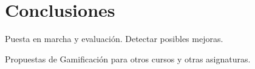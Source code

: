 \documentclass[a4paper, 12pt]{book}
\begin{document}

\cleardoublepage
\chapter{Conclusiones}
\label{chap:conclusiones}



\label{sec:trabajos_futuros}

Puesta en marcha y evaluación. Detectar posibles mejoras.

Propuestas de Gamificación para otros cursos y otras asignaturas.




\cleardoublepage
\appendix



\cleardoublepage



\printindex
\end{document}
